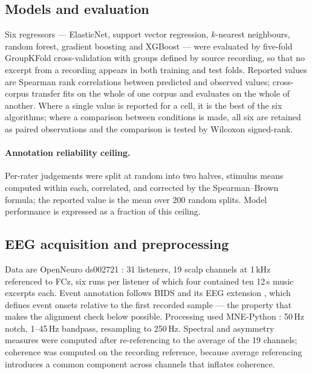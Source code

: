\subsection*{Models and evaluation}

Six regressors --- ElasticNet, support vector regression, $k$-nearest neighbours,
random forest, gradient boosting and XGBoost \citep{chen2016xgboost} --- were
evaluated by five-fold GroupKFold cross-validation with groups defined by source
recording, so that no excerpt from a recording appears in both training and test
folds. Reported values are Spearman rank correlations between predicted and
observed values; cross-corpus transfer fits on the whole of one corpus and
evaluates on the whole of another. Where a single value is reported for a cell, it
is the best of the six algorithms; where a comparison between conditions is made,
all six are retained as paired observations and the comparison is tested by
Wilcoxon signed-rank.

\paragraph{Annotation reliability ceiling.}
Per-rater judgements were split at random into two halves, stimulus means computed
within each, correlated, and corrected by the Spearman--Brown formula; the reported
value is the mean over 200 random splits. Model performance is expressed as a
fraction of this ceiling.

\subsection*{EEG acquisition and preprocessing}

Data are OpenNeuro ds002721 \citep{daly2018data}: 31 listeners, 19 scalp channels
at 1\,kHz referenced to FCz, six runs per listener of which four contained ten
12\,s music excerpts each. Event annotation follows BIDS and its EEG extension
\citep{gorgolewski2016,pernet2019}, which defines event onsets relative to the
first recorded sample --- the property that makes the alignment check below
possible. Processing used MNE-Python \citep{gramfort2013}: 50\,Hz notch, 1--45\,Hz
bandpass, resampling to 250\,Hz. Spectral and asymmetry measures were computed
after re-referencing to the average of the 19 channels; coherence was computed on
the recording reference, because average referencing introduces a common component
across channels that inflates coherence.

